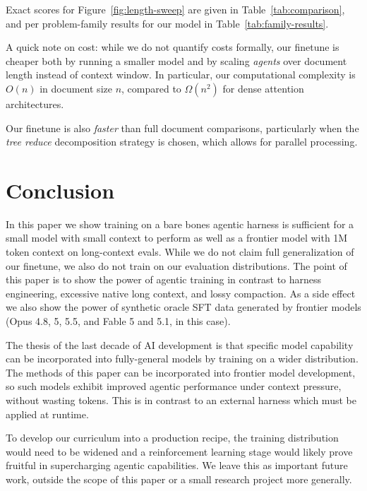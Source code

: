 Exact scores for Figure~\ref{fig:length-sweep} are given in Table~\ref{tab:comparison}, and per problem-family results for our model in Table~\ref{tab:family-results}.

A quick note on cost: while we do not quantify costs formally, our finetune is cheaper both by running a smaller model and by scaling \emph{agents} over document length instead of context window. In particular, our computational complexity is $O(n)$ in document size $n$, compared to $\Omega(n^2)$ for dense attention architectures.

Our finetune is also \emph{faster} than full document comparisons, particularly when the \emph{tree reduce} decomposition strategy is chosen, which allows for parallel processing.





\section{Conclusion}
\label{conclude}

In this paper we show training on a bare bones agentic harness is sufficient for a small model with small context to perform as well as a frontier model with 1M token context on long-context evals. While we do not claim full generalization of our finetune, we also do not train on our evaluation distributions. The point of this paper is to show the power of agentic training in contrast to harness engineering, excessive native long context, and lossy compaction. As a side effect we also show the power of synthetic oracle SFT data generated by frontier models (Opus 4.8, 5, 5.5, and Fable 5 and 5.1, in this case).

The thesis of the last decade of AI development is that specific model capability can be incorporated into fully-general models by training on a wider distribution. The methods of this paper can be incorporated into frontier model development, so such models exhibit improved agentic performance under context pressure, without wasting tokens. This is in contrast to an external harness which must be applied at runtime.

To develop our curriculum into a production recipe, the training distribution would need to be widened and a reinforcement learning stage would likely prove fruitful in supercharging agentic capabilities. We leave this as important future work, outside the scope of this paper or a small research project more generally.

